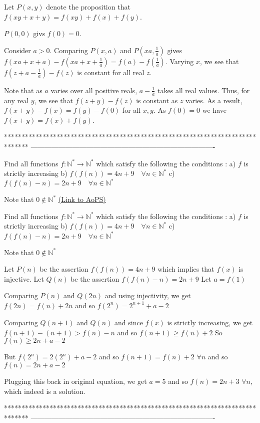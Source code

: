 \begin{solution}
	Let $P(x,y)$ denote the proposition that $f(xy+x+y)=f(xy)+f(x)+f(y)$.

$P(0,0)$ givs $f(0)=0$.

Consider $a>0$.
Comparing $P(x,a)$ and $P(xa, \frac{1}{a})$ gives $f(xa+x+a) - f(xa+x+ \frac{1}{a}) = f(a) - f( \frac{1}{a})$.
Varying $x$, we see that $f(z+a- \frac{1}{a}) - f(z)$ is constant for all real $z$.

Note that as $a$ varies over all positive reals, $a - \frac{1}{a}$ takes all real values. 
Thus, for any real $y$, we see that $f(z+y)-f(z)$ is constant as $z$ varies.
As a result, $f(x+y)-f(x)=f(y)-f(0)$ for all $x,y$. As $f(0)=0$ we have $f(x+y)=f(x)+f(y)$.
\end{solution}
*******************************************************************************
-------------------------------------------------------------------------------

\begin{problem}
	Find all functions $f:\mathbb{N}^*\to\mathbb{N}^*$ which satisfy the following the conditions :
a) $f$ is strictly increasing 
b) $f(f(n))=4n+9 \quad \forall n\in\mathbb{N}^*$
c) $f(f(n)-n)=2n+9 \quad \forall n\in\mathbb{N}^*$

Note that $0\notin \mathbb{N}^*$
	\flushright \href{https://artofproblemsolving.com/community/c6h561366}{(Link to AoPS)}
\end{problem}



\begin{solution}
	\begin{tcolorbox}Find all functions $f:\mathbb{N}^*\to\mathbb{N}^*$ which satisfy the following the conditions :
a) $f$ is strictly increasing 
b) $f(f(n))=4n+9 \quad \forall n\in\mathbb{N}^*$
c) $f(f(n)-n)=2n+9 \quad \forall n\in\mathbb{N}^*$

Note that $0\notin \mathbb{N}^*$\end{tcolorbox}
Let $P(n)$ be the assertion $f(f(n))=4n+9$ which implies that $f(x)$ is injective.
Let $Q(n)$ be the assertion $f(f(n)-n)=2n+9$
Let $a=f(1)$

Comparing $P(n)$ and $Q(2n)$ and using injectivity, we get $f(2n)=f(n)+2n$ and so $f(2^n)=2^{n+1}+a-2$

Comparing $Q(n+1)$ and $Q(n)$ and since $f(x)$ is strictly increasing, we get $f(n+1)-(n+1)>f(n)-n$ and so $f(n+1)\ge f(n)+2$
So $f(n)\ge 2n+a-2$

But $f(2^n)=2(2^n)+a-2$ and so $f(n+1)=f(n)+2$ $\forall n$ and so $f(n)=2n+a-2$

Plugging this back in original equation, we get $a=5$ and so $\boxed{f(n)=2n+3}$ $\forall n$, which indeed is a solution.
\end{solution}
*******************************************************************************
-------------------------------------------------------------------------------

